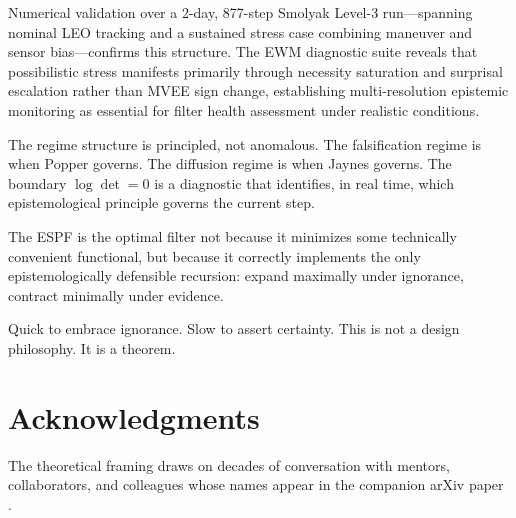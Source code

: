 \documentclass[12pt]{article}
\begin{document}
Numerical validation over a 2-day, 877-step Smolyak Level-3 run---spanning nominal LEO tracking and a sustained stress case combining maneuver and sensor bias---confirms this structure. The EWM diagnostic suite reveals that possibilistic stress manifests primarily through necessity saturation and surprisal escalation rather than MVEE sign change, establishing multi-resolution epistemic monitoring as essential for filter health assessment under realistic conditions.

The regime structure is principled, not anomalous. The falsification regime is when Popper governs. The diffusion regime is when Jaynes governs. The boundary $\log\det = 0$ is a diagnostic that identifies, in real time, which epistemological principle governs the current step.

The ESPF is the optimal filter not because it minimizes some technically convenient functional, but because it correctly implements the only epistemologically defensible recursion: expand maximally under ignorance, contract minimally under evidence.

Quick to embrace ignorance. Slow to assert certainty. This is not a design philosophy. It is a theorem.

\section*{Acknowledgments}
The theoretical framing draws on decades of conversation with mentors, collaborators, and colleagues whose names appear in the companion arXiv paper \cite{espf}.
\end{document}
